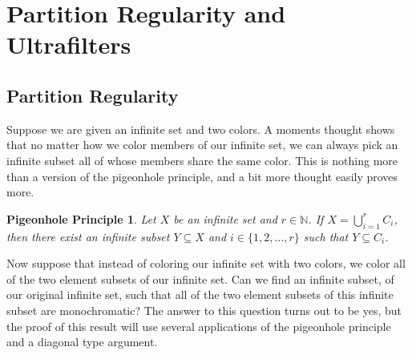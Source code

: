 \documentclass[12pt]{article}
\theoremstyle{plain}
\newtheorem*{php}{Pigeonhole Principle}
\begin{document}
\section{Partition Regularity and Ultrafilters}

\newcommand{\la}{\langle}
\newcommand{\ra}{\rangle}

\newcommand{\bbN}{\mathbb{N}}

\subsection{Partition Regularity}
Suppose we are given an infinite set and two colors.
A moments thought shows that no matter how we color members of our
infinite set, we can always pick an infinite subset all of whose
members share the same color.
This is nothing more than a version of the pigeonhole principle, and a
bit more thought easily proves more.

\begin{php}
  Let $X$ be an infinite set and $r \in \bbN$.
  If $X = \bigcup_{i=1}^r C_i$, then there exist an infinite subset $Y
  \subseteq X$ and $i \in \{1, 2, \ldots, r\}$ such that $Y \subseteq
  C_i$.
\end{php}

Now suppose that instead of coloring our infinite set with two colors,
we color all of the two element subsets of our infinite set. 
Can we find an infinite subset, of our original infinite set, such
that all of the two element subsets of this infinite subset are
monochromatic?
The answer to this question turns out to be yes, but the proof of this
result will use several applications of the pigeonhole principle and a
diagonal type argument.
\end{document}
